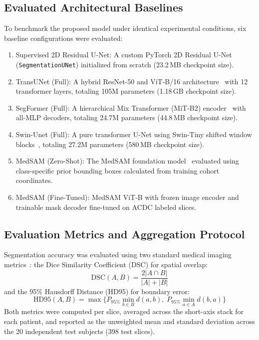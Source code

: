 \documentclass[pdflatex,sn-mathphys]{sn-jnl}
\theoremstyle{thmstyleone}
\theoremstyle{thmstyletwo}
\theoremstyle{thmstylethree}
\begin{document}
\subsection{Evaluated Architectural Baselines}
To benchmark the proposed model under identical experimental conditions, six baseline configurations were evaluated:
\begin{enumerate}
    \item Supervised 2D Residual U-Net: A custom PyTorch 2D Residual U-Net (\texttt{SegmentationUNet}) initialized from scratch (23.2\,MB checkpoint size).
    \item TransUNet (Full): A hybrid ResNet-50 and ViT-B/16 architecture~\cite{chen2021transunet} with 12 transformer layers, totaling 105M parameters (1.18\,GB checkpoint size).
    \item SegFormer (Full): A hierarchical Mix Transformer (MiT-B2) encoder~\cite{xie2021segformer} with all-MLP decoders, totaling 24.7M parameters (44.8\,MB checkpoint size).
    \item Swin-Unet (Full): A pure transformer U-Net using Swin-Tiny shifted window blocks~\cite{cao2022swin}, totaling 27.2M parameters (580\,MB checkpoint size).
    \item MedSAM (Zero-Shot): The MedSAM foundation model~\cite{ma2024medsam} evaluated using class-specific prior bounding boxes calculated from training cohort coordinates.
    \item MedSAM (Fine-Tuned): MedSAM ViT-B with frozen image encoder and trainable mask decoder fine-tuned on ACDC labeled slices.
\end{enumerate}

\subsection{Evaluation Metrics and Aggregation Protocol}
Segmentation accuracy was evaluated using two standard medical imaging metrics~\cite{taha2015metrics,bernard2018deep}: the Dice Similarity Coefficient (DSC) for spatial overlap:
\begin{equation}
\text{DSC}(A, B) = \frac{2 |A \cap B|}{|A| + |B|}
\label{eq:dice}
\end{equation}
and the 95\% Hausdorff Distance (HD95) for boundary error:
\begin{equation}
\text{HD95}(A, B) = \max \bigl\{ P_{95\%} \min_{b \in B} d(a,b), \; P_{95\%} \min_{a \in A} d(b,a) \bigr\}
\label{eq:hd95}
\end{equation}
Both metrics were computed per slice, averaged across the short-axis stack for each patient, and reported as the unweighted mean and standard deviation across the 20 independent test subjects (398 test slices).
\end{document}
